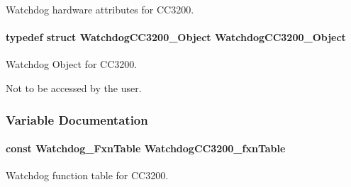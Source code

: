 Watchdog hardware attributes for C\+C3200. 

\paragraph[{Watchdog\+C\+C3200\+\_\+\+Object}]{\setlength{\rightskip}{0pt plus 5cm}typedef struct {\bf Watchdog\+C\+C3200\+\_\+\+Object}  {\bf Watchdog\+C\+C3200\+\_\+\+Object}}\label{_watchdog_c_c3200_8h_acac7932b9436e05c5f1a1901739cad15}


Watchdog Object for C\+C3200. 

Not to be accessed by the user. 

\subsubsection{Variable Documentation}
\paragraph[{Watchdog\+C\+C3200\+\_\+fxn\+Table}]{\setlength{\rightskip}{0pt plus 5cm}const {\bf Watchdog\+\_\+\+Fxn\+Table} Watchdog\+C\+C3200\+\_\+fxn\+Table}\label{_watchdog_c_c3200_8h_aa8da6260d2ca5dbe363e6d82748e9375}


Watchdog function table for C\+C3200. 

